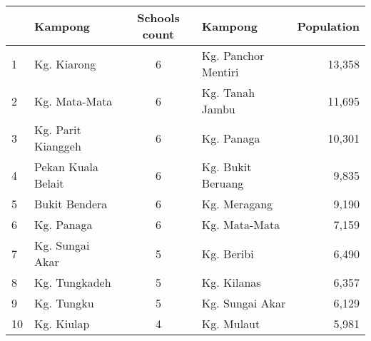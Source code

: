 \documentclass[12pt]{article}
\begin{document}
\begin{table}[]
\begin{tabular}{@{}llc|lr@{}}
\toprule
                        & Kampong                                 & Schools count             & Kampong                                 & Population                     \\ \midrule
\multicolumn{1}{l|}{1}  & Kg. Kiarong                             & 6                         & Kg. Panchor Mentiri                     & 13,358                         \\
\multicolumn{1}{l|}{2}  & \cellcolor[HTML]{FFFFC7}Kg. Mata-Mata   & \cellcolor[HTML]{FFFFC7}6 & Kg. Tanah Jambu                         & 11,695                         \\
\multicolumn{1}{l|}{3}  & Kg. Parit Kianggeh                      & 6                         & \cellcolor[HTML]{FFFFC7}Kg. Panaga      & \cellcolor[HTML]{FFFFC7}10,301 \\
\multicolumn{1}{l|}{4}  & Pekan Kuala Belait                      & 6                         & Kg. Bukit Beruang                       & 9,835                          \\
\multicolumn{1}{l|}{5}  & Bukit Bendera                           & 6                         & Kg. Meragang                            & 9,190                          \\
\multicolumn{1}{l|}{6}  & \cellcolor[HTML]{FFFFC7}Kg. Panaga      & \cellcolor[HTML]{FFFFC7}6 & \cellcolor[HTML]{FFFFC7}Kg. Mata-Mata   & \cellcolor[HTML]{FFFFC7}7,159  \\
\multicolumn{1}{l|}{7}  & \cellcolor[HTML]{FFFFC7}Kg. Sungai Akar & \cellcolor[HTML]{FFFFC7}5 & Kg. Beribi                              & 6,490                          \\
\multicolumn{1}{l|}{8}  & Kg. Tungkadeh                           & 5                         & Kg. Kilanas                             & 6,357                          \\
\multicolumn{1}{l|}{9}  & Kg. Tungku                              & 5                         & \cellcolor[HTML]{FFFFC7}Kg. Sungai Akar & \cellcolor[HTML]{FFFFC7}6,129  \\
\multicolumn{1}{l|}{10} & Kg. Kiulap                              & 4                         & Kg. Mulaut                              & 5,981                          \\ \bottomrule
\end{tabular}
\end{table}
\end{document}
